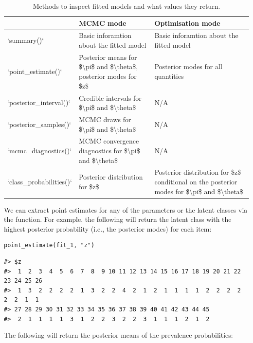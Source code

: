 \begin{table}

\caption{\label{tab:inpsecting-fitted-models}Methods to inspect fitted models and what values they return.}
\centering
\begin{tabular}[t]{l|l|l}
\hline
  & MCMC mode & Optimisation mode\\
\hline
`summary()` & Basic inforamtion about the fitted model & Basic inforamtion about the fitted model\\
\hline
`point\_estimate()` & Posterior means for \$\textbackslash{}pi\$ and \$\textbackslash{}theta\$, posterior modes for \$z\$ & Posterior modes for all quantities\\
\hline
`posterior\_interval()` & Credible intervals for \$\textbackslash{}pi\$ and \$\textbackslash{}theta\$ & N/A\\
\hline
`posterior\_samples()` & MCMC draws for \$\textbackslash{}pi\$ and \$\textbackslash{}theta\$ & N/A\\
\hline
`mcmc\_diagnostics()` & MCMC convergence diagnostics for \$\textbackslash{}pi\$ and \$\textbackslash{}theta\$ & N/A\\
\hline
`class\_probabilities()` & Posterior distribution for \$z\$ & Posterior distribution for \$z\$ conditional on the
                          posterior modes for \$\textbackslash{}pi\$ and \$\textbackslash{}theta\$\\
\hline
\end{tabular}
\end{table}

We can extract point estimates for any of the parameters or the latent classes
via the  function. For example, the following will
return the latent class with the highest posterior probability (i.e., the
posterior modes) for each item:

\begin{verbatim}
point_estimate(fit_1, "z")
\end{verbatim}

\begin{verbatim}
#> $z
#>  1  2  3  4  5  6  7  8  9 10 11 12 13 14 15 16 17 18 19 20 21 22 23 24 25 26 
#>  1  3  2  2  2  2  1  3  2  2  4  2  1  2  1  1  1  1  2  2  2  2  2  2  1  1 
#> 27 28 29 30 31 32 33 34 35 36 37 38 39 40 41 42 43 44 45 
#>  2  1  1  1  1  3  1  2  2  3  2  2  3  1  1  1  2  1  2
\end{verbatim}

The following will return the posterior means of the prevalence probabilities:

